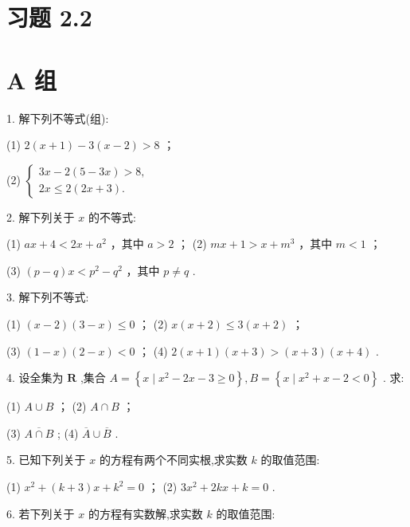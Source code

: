\documentclass[10pt]{article}
\begin{document}
\section*{习题 2.2}

\section*{A 组}

1. 解下列不等式(组):

(1) \(2\left( {x + 1}\right)  - 3\left( {x - 2}\right)  > 8\) ；

(2) \(\left\{  \begin{array}{l} {3x} - 2\left( {5 - {3x}}\right)  > 8, \\  {2x} \leq  2\left( {{2x} + 3}\right) . \end{array}\right.\)

2. 解下列关于 \(x\) 的不等式:

(1) \({ax} + 4 < {2x} + {a}^{2}\) ，其中 \(a > 2\) ； (2) \({mx} + 1 > x + {m}^{3}\) ，其中 \(m < 1\) ；

(3) \(\left( {p - q}\right) x < {p}^{2} - {q}^{2}\) ，其中 \(p \neq  q\) .

3. 解下列不等式:

(1) \(\left( {x - 2}\right) \left( {3 - x}\right)  \leq  0\) ； (2) \(x\left( {x + 2}\right)  \leq  3\left( {x + 2}\right)\) ；

(3) \(\left( {1 - x}\right) \left( {2 - x}\right)  < 0\) ； (4) \(2\left( {x + 1}\right) \left( {x + 3}\right)  > \left( {x + 3}\right) \left( {x + 4}\right)\) .

4. 设全集为 \(\mathbf{R}\) ,集合 \(A = \left\{  {x \mid  {x}^{2} - {2x} - 3 \geq  0}\right\}  ,B = \left\{  {x \mid  {x}^{2} + x - 2 < 0}\right\}\) . 求:

(1) \(A \cup  B\) ； (2) \(A \cap  B\) ；

(3) \(\overline{A \cap  B}\) ; (4) \(\overline{A} \cup  \overline{B}\) .

5. 已知下列关于 \(x\) 的方程有两个不同实根,求实数 \(k\) 的取值范围:

(1) \({x}^{2} + \left( {k + 3}\right) x + {k}^{2} = 0\) ； (2) \(3{x}^{2} + {2kx} + k = 0\) .

6. 若下列关于 \(x\) 的方程有实数解,求实数 \(k\) 的取值范围:

\section*{}
\end{document}
